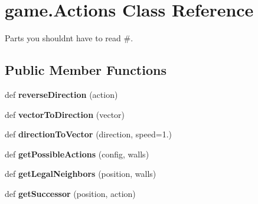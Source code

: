 \hypertarget{classgame_1_1_actions}{}\section{game.\+Actions Class Reference}
\label{classgame_1_1_actions}


Parts you shouldn\textquotesingle{}t have to read \#.  


\subsection*{Public Member Functions}
\begin{DoxyCompactItemize}
\item 
\mbox{\label{classgame_1_1_actions_ab2967b5dec401c833b82072d60c1e2bc}} 
def {\bfseries reverse\+Direction} (action)
\item 
\mbox{\label{classgame_1_1_actions_acbed7e87162d40562723eac95b133a1b}} 
def {\bfseries vector\+To\+Direction} (vector)
\item 
\mbox{\label{classgame_1_1_actions_a530b953a99063e4f43f0fea82d3d9e47}} 
def {\bfseries direction\+To\+Vector} (direction, speed=1.)
\item 
\mbox{\label{classgame_1_1_actions_a9ba01c61cc11f02421a6d78385fe93bb}} 
def {\bfseries get\+Possible\+Actions} (config, walls)
\item 
\mbox{\label{classgame_1_1_actions_a840d413fbfdff5995c9369f4b707aae6}} 
def {\bfseries get\+Legal\+Neighbors} (position, walls)
\item 
\mbox{\label{classgame_1_1_actions_acf62d43d368d2398b1b568abcbd2e937}} 
def {\bfseries get\+Successor} (position, action)
\end{DoxyCompactItemize}
